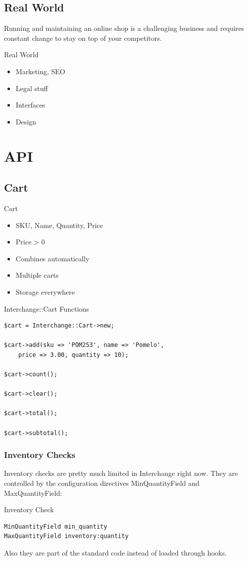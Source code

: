 \subsection{Real World}
Running and maintaining an online shop is a challenging business
and requires constant change to stay on top of your competitors.

\begin{frame}{Real World}
\begin{itemize}
\item Marketing, SEO
\item Legal stuff
\item Interfaces
\item Design
\end{itemize}
\end{frame}

\section{API}
\subsection{Cart}
\begin{frame}{Cart}
\begin{itemize}
\item SKU, Name, Quantity, Price
\item Price > 0
\item Combines automatically
\item Multiple carts
\item Storage everywhere
\end{itemize}
\end{frame}

\begin{frame}[fragile]{Interchange::Cart Functions}
\begin{lstlisting}
$cart = Interchange::Cart->new;

$cart->add(sku => 'POM253', name => 'Pomelo',
    price => 3.00, quantity => 10);

$cart->count();

$cart->clear();

$cart->total();

$cart->subtotal();
\end{lstlisting}
\end{frame}

\subsubsection{Inventory Checks}
Inventory checks are pretty much limited in Interchange right now.
They are controlled by the configuration directives MinQuantityField
and MaxQuantityField:
\begin{frame}[fragile]{Inventory Check}
\begin{lstlisting}
MinQuantityField min_quantity
MaxQuantityField inventory:quantity 
\end{lstlisting}
\end{frame}
Also they are part of the standard code instead of loaded through
hooks.


